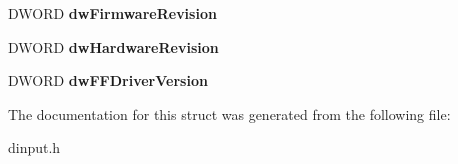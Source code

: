 \begin{DoxyCompactItemize}
\item 
\hypertarget{struct_d_i_d_e_v_c_a_p_s_ade3d390194cdc9034f11053b9db27558}{D\-W\-O\-R\-D {\bfseries dw\-Firmware\-Revision}}\label{struct_d_i_d_e_v_c_a_p_s_ade3d390194cdc9034f11053b9db27558}

\item 
\hypertarget{struct_d_i_d_e_v_c_a_p_s_a0d1c4a1d6132386b749c37bb8890fb57}{D\-W\-O\-R\-D {\bfseries dw\-Hardware\-Revision}}\label{struct_d_i_d_e_v_c_a_p_s_a0d1c4a1d6132386b749c37bb8890fb57}

\item 
\hypertarget{struct_d_i_d_e_v_c_a_p_s_ab38df626ae6c48697e37a6582f89492c}{D\-W\-O\-R\-D {\bfseries dw\-F\-F\-Driver\-Version}}\label{struct_d_i_d_e_v_c_a_p_s_ab38df626ae6c48697e37a6582f89492c}

\end{DoxyCompactItemize}


The documentation for this struct was generated from the following file\-:\begin{DoxyCompactItemize}
\item 
dinput.\-h\end{DoxyCompactItemize}

